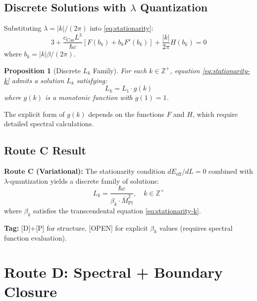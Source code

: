 \documentclass[11pt,a4paper]{article}
\newtheorem{proposition}[theorem]{Proposition}
\begin{document}
\subsection{Discrete Solutions with $\lambda$ Quantization}

Substituting $\lambda = |k|/(2\pi)$ into \eqref{eq:stationarity}:
\begin{equation}
  3 + \frac{c_{\text{Cas}} L^3}{\hbar c} \left[ F(b_k) + b_k F'(b_k) \right]
    + \frac{|k|}{2\pi} H(b_k) = 0
  \label{eq:stationarity-k}
\end{equation}
where $b_k = |k| \beta / (2\pi)$.

\begin{proposition}[Discrete $L_k$ Family]
\label{prop:discrete-Lk}
For each $k \in \mathbb{Z}^+$, equation \eqref{eq:stationarity-k} admits a
solution $L_k$ satisfying:
\begin{equation}
  L_k = L_1 \cdot g(k)
  \label{eq:Lk-family}
\end{equation}
where $g(k)$ is a monotonic function with $g(1) = 1$.
\end{proposition}

The explicit form of $g(k)$ depends on the functions $F$ and $H$, which require
detailed spectral calculations.

\subsection{Route C Result}

\begin{resultbox}
\textbf{Route C (Variational):} The stationarity condition $dE_{\text{eff}}/dL = 0$
combined with $\lambda$-quantization yields a discrete family of solutions:
\begin{equation}
  \boxed{L_k = \frac{\hbar c}{\beta_k \cdot \bar{M}_{\text{Pl}}^2},
         \quad k \in \mathbb{Z}^+}
  \label{eq:route-c-result}
\end{equation}
where $\beta_k$ satisfies the transcendental equation \eqref{eq:stationarity-k}.

\textbf{Tag:} [D]+[P] for structure. [OPEN] for explicit $\beta_k$ values
(requires spectral function evaluation).
\end{resultbox}

\section{Route D: Spectral + Boundary Closure}
\label{sec:route-d}
\end{document}
